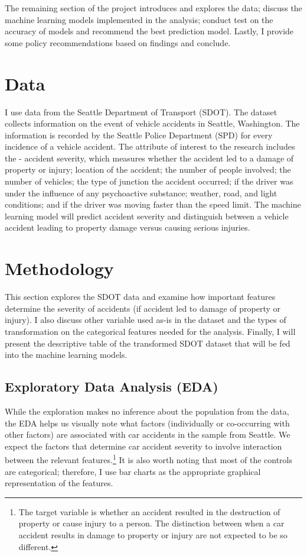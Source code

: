\documentclass[a4paper,12pt]{article}
\begin{document}
The remaining section of the project introduces and explores the data; discuss the machine learning models implemented in the analysis; conduct test on the accuracy of models and recommend the best prediction model. Lastly, I provide some policy recommendations based on findings and conclude.

\section{Data}
I use data from the Seattle Department of Transport (SDOT).  The dataset collects information on the event of vehicle accidents in Seattle, Washington. The information is recorded by the Seattle Police Department (SPD) for every incidence of a vehicle accident. The attribute of interest to the research includes the - accident severity, which measures whether the accident led to a damage of property or injury; location of the accident; the number of people involved; the number of vehicles; the type of junction the accident occurred; if the driver was under the influence of any psychoactive substance; weather, road, and light conditions; and if the driver was moving faster than the speed limit. The machine learning model will predict accident severity and distinguish between a vehicle accident leading to property damage versus causing serious injuries.

\newpage
\section{Methodology}
This section explores the SDOT data and examine how important features determine the severity of accidents (if accident led to damage of property or injury). I also discuss other variable used as-is in the dataset and the types of transformation on the categorical features needed for the analysis. Finally, I will present the descriptive table of the transformed SDOT dataset that will be fed into the machine learning models.

\subsection{Exploratory Data Analysis (EDA)}
While the exploration makes no inference about the population from the data, the EDA helps us visually note what factors (individually or co-occurring with other factors) are associated with car accidents in the sample from Seattle. We expect the factors that determine car accident severity to involve interaction between the relevant features.\footnote{The target variable is whether an accident resulted in the destruction of property or cause injury to a person. The distinction between when a car accident results in damage to property or injury are not expected to be so different.} It is also worth noting that most of the controls are categorical; therefore, I use bar charts as the appropriate graphical representation of the features.\\
\end{document}
